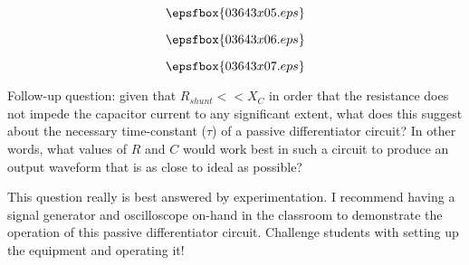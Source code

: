 





$$\epsfbox{03643x05.eps}$$

$$\epsfbox{03643x06.eps}$$

$$\epsfbox{03643x07.eps}$$

\vskip 10pt

Follow-up question: given that $R_{shunt} << X_C$ in order that the resistance does not impede the capacitor current to any significant extent, what does this suggest about the necessary time-constant ($\tau$) of a passive differentiator circuit?  In other words, what values of $R$ and $C$ would work best in such a circuit to produce an output waveform that is as close to ideal as possible?







This question really is best answered by experimentation.  I recommend having a signal generator and oscilloscope on-hand in the classroom to demonstrate the operation of this passive differentiator circuit.  Challenge students with setting up the equipment and operating it!




